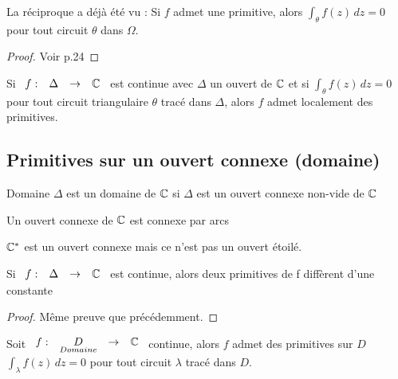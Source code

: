 \documentclass[]{report}
\begin{document}
\begin{re}{}{}
    La réciproque a déjà été vu : Si $f$ admet une primitive, alors $\displaystyle{\int_\theta f(z)\,dz=0}$ pour tout circuit $\theta$ dans $\Omega$.
\end{re}

\begin{proof}{}{}
    Voir p.24
\end{proof}

\begin{cor}{}{}
    Si $\begin{array}{ccccc}
f : & \Delta & \to & \mathbb{C}
\end{array}$ est continue avec $\Delta$ un ouvert de $\mathbb{C}$ et si $\displaystyle{\int_\theta}f(z)\,dz=0$ pour tout circuit triangulaire $\theta$ tracé dans $\Delta$, alors $f$ admet localement des primitives.
\end{cor}

\subsection{Primitives sur un ouvert connexe (domaine)}

\begin{df}{Domaine}{}
    $\Delta$ est un domaine de $\mathbb{C}$ si $\Delta$ est un ouvert connexe non-vide de $\mathbb{C}$
\end{df}

\begin{ra}{}{}
    Un ouvert connexe de $\mathbb{C}$ est connexe par arcs
\end{ra}

\begin{ex}{}{}
    $\mathbb{C}^*$ est un ouvert connexe mais ce n'est pas un ouvert étoilé.
\end{ex}

\begin{lm}{}{}
    Si $\begin{array}{ccccc}
f : & \Delta & \to & \mathbb{C}
\end{array}$ est continue, alors deux primitives de f diffèrent d'une constante
\end{lm}

\begin{proof}{}{}
    Même preuve que précédemment.
\end{proof}

\begin{prop}{}{}
    Soit $\begin{array}{ccccc}
f : & \underset{Domaine}{D} & \to & \mathbb{C}
\end{array}$ continue, alors $f$ admet des primitives sur $D$ \ssi $\displaystyle{\int_\lambda f(z)\,dz=0}$ pour tout circuit $\lambda$ tracé dans $D$.
\end{prop}
\end{document}
